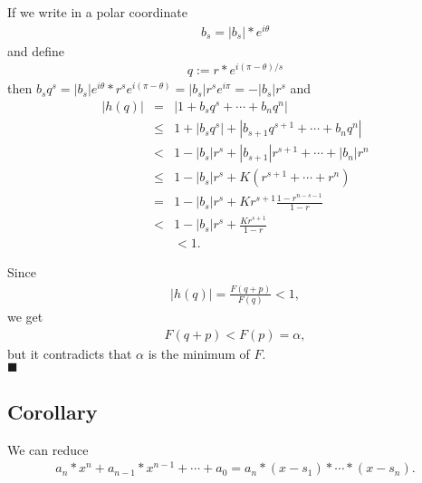 \documentclass[11pt]{book}
\begin{document}
If we write in a polar coordinate
\begin{eqnarray}
b_s = |b_s| * e^{i \theta}
\end{eqnarray}
and define
\begin{eqnarray}
q := r * e^{i (\pi - \theta)/s}
\end{eqnarray}
then $b_s q^s = |b_s| e^{i\theta} * r^s e^{i(\pi-\theta)} = |b_s| r^s e^{i\pi} = - |b_s| r^s$ and
\begin{eqnarray}
|h(q)| &=& |1 + b_s q^s + \cdots + b_n q^n| \\
&\leq& 1 + |b_s q^s| + |b_{s+1} q^{s+1} + \cdots + b_n q^n| \\
&<& 1 - |b_s| r^s + |b_{s+1}| r^{s+1} + \cdots + |b_n| r^n \\
&\leq& 1 - |b_s| r^s + K\left( r^{s+1} + \cdots + r^n \right) \\
&=& 1 - |b_s| r^s + K r^{s+1} \frac{1 - r^{n-s-1}}{1-r} \\
&<& 1 - |b_s| r^s + \frac{K r^{s+1}}{1-r} \\
&&< 1.
\end{eqnarray}

Since 
\begin{eqnarray}
|h(q)| = \frac{F(q+p)}{F(q)} < 1,
\end{eqnarray}
we get
\begin{eqnarray}
F(q+p) < F(p) = \alpha,
\end{eqnarray}
but it contradicts that $\alpha$ is the minimum of $F$.\\
$\blacksquare$

\subsection{Corollary}
We can reduce
\begin{eqnarray}
a_n * x^n + a_{n-1} * x^{n-1} + \cdots + a_0
=
a_n * (x-s_1) * \cdots * (x-s_n).
\end{eqnarray}
\end{document}
